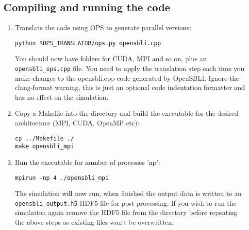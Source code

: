 \documentclass[11pt]{article}
\begin{document}
\subsection{Compiling and running the code}\label{sec:compiling_code}
\begin{enumerate}
\item{Translate the code using OPS to generate parallel versions:}
\begin{verbatim}
python $OPS_TRANSLATOR/ops.py opensbli.cpp
\end{verbatim}
You should now have folders for CUDA, MPI and so on, plus an \verb|opensbli_ops.cpp| file. You need to apply the translation step each time you make changes to the opensbli.cpp code generated by OpenSBLI. Ignore the clang-format warning, this is just an optional code indentation formatter and has no effect on the simulation.

\item{Copy a Makefile into the directory and build the executable for the desired architecture (MPI, CUDA, OpenMP etc):}
\begin{verbatim}
cp ../Makefile ./
make opensbli_mpi
\end{verbatim}

\item{Run the executable for number of processes 'np':}
\begin{verbatim}
mpirun -np 4 ./opensbli_mpi
\end{verbatim}
The simulation will now run, when finished the output data is written to an \verb|opensbli_output.h5| HDF5 file for post-processing. If you wish to run the simulation again remove the HDF5 file from the directory before repeating the above steps as existing files won't be overwritten.

\end{enumerate}
\end{document}
